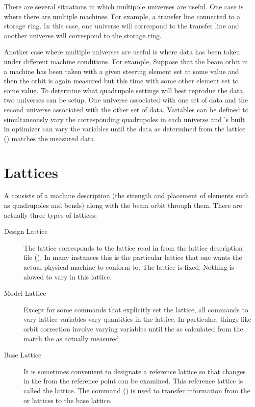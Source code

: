 There are several situations in which multipole universes are
useful. One case is where there are multiple machines. For example, a
transfer line connected to a storage ring. In this case, one universe
will correspond to the transfer line and another universe will
correspond to the storage ring. 

Another case where multiple universes are useful is where data has
been taken under different machine conditions. For example, Suppose
that the beam orbit in a machine has been taken with a given steering
element set at some value and then the orbit is again measured but
this time with some other element set to some value. To determine what
quadrupole settings will best reprodue the data, two universes can be
setup. One universe associated with one set of data and the second
universe associated with the other set of data. Variables can be
defined to simultaneously vary the corresponding quadrupoles in each
universe and \tao's built in optimizer can vary the variables until
the data as determined from the  lattice ()
matches the measured data.

\section{Lattices}
\label{s:lattice}

A  consists of a machine description (the strength and
placement of elements such as quadrupoles and bends) along with the
beam orbit through them. There are actually three types of lattices:
  \vspace*{-3ex}
  \begin{description}
  \item[Design Lattice] \Newline 
The  lattice corresponds to the lattice read in from the
lattice description file (). In many instances this
is the particular lattice that one wants the actual physical machine
to conform to. The  lattice is fixed. Nothing is alowed to
vary in this lattice.
  \item[Model Lattice] \Newline
Except for some commands that explicitly set the  lattice,
all \tao commands to vary lattice variables vary quantities in the
 lattice. In particular, things like orbit correction
involve varying  variables until the  as calculated
from the  match the  as actually measured.
  \item[Base Lattice] \Newline
It is sometimes convenient to designate a reference lattice so that
changes in the  from the reference point can be examined.
This reference lattice is called the  lattice. The 
command () is used to transfer information from the
 or  lattices to the base lattice.
  \end{description}

